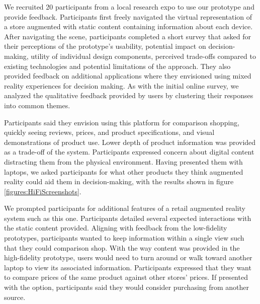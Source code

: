 We recruited 20 participants from a local research expo to use our prototype and provide feedback. Participants first freely navigated the virtual representation of a store augmented with static content containing information about each device.
After navigating the scene, participants completed a short survey that asked for their perceptions of the prototype's usability, potential impact on decision-making, utility of individual design components, perceived trade-offs compared to existing technologies and potential limitations of the approach. They also provided feedback on additional applications where they envisioned using mixed reality experiences for decision making. As with the initial online survey, we analyzed the qualitative feedback provided by users by clustering their responses into common themes.

Participants said they envision using this platform for comparison shopping, quickly seeing reviews, prices, and product specifications, and visual demonstrations of product use. 
Lower depth of product information was provided as a trade-off of the system. %
Participants expressed concern about digital content distracting them from the physical environment. Having presented them with laptops, we asked participants for what other products they 
think %
augmented reality could aid them in decision-making, with the results shown in figure \ref{figures:HiFiScreenshots}.  

We prompted participants for additional features of a retail augmented reality system such as this one. Participants detailed several expected interactions with the static content provided. Aligning with feedback from the low-fidelity prototypes, participants wanted to keep information within a single view such that they could comparison shop. With the way content was provided in the high-fidelity prototype, users would need to turn around or walk toward another laptop to view its associated information. Participants expressed that they want to compare prices of the same product against other stores' prices. If presented with the option, participants said they would consider purchasing from another source. 